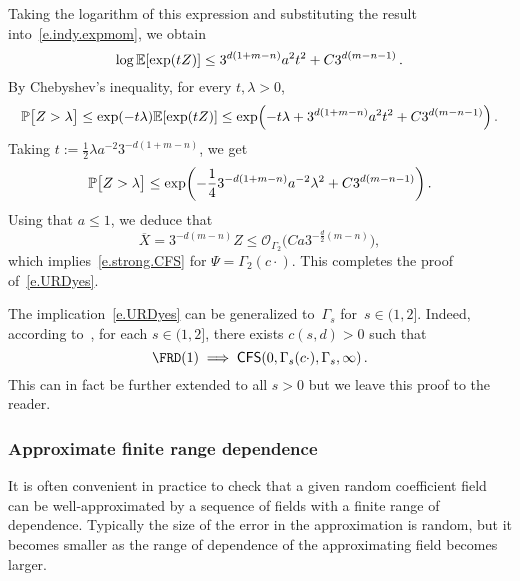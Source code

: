 \documentclass[11pt]{article} %
\numberwithin{equation}{section}
\theoremstyle{definition}
\let\originalleft\left
\let\originalright\right
\renewcommand{\left}{\mathopen{}\mathclose\bgroup\originalleft}
\renewcommand{\right}{\aftergroup\egroup\originalright}
\renewcommand{\P}{\mathbb{P}}
\newcommand{\E}{\mathbb{E}}
\renewcommand{\O}{\mathcal{O}}
\newcommand{\CFS}{\mathsf{CFS}}
\begin{document}
Taking the logarithm of this expression and substituting the result into~\eqref{e.indy.expmom}, we obtain 
\begin{equation*}
\log \E \left[ \exp\left( tZ\right) \right]
\leq 
3^{d(1+m-n)} a^2 t^2 + C 3^{d(m-n-1)} 
\,.
\end{equation*}
By Chebyshev's inequality, for every $t,\lambda>0$, 
\begin{align*}
\P \bigl[ Z > \lambda \bigr]
\leq 
\exp\left( -t\lambda \right)
\E \left[  \exp \left( t Z \right) \right]
\leq 
\exp\left( -t\lambda + 3^{d(1+m-n)} a^2 t^2 + C3^{d(m-n-1)} \right)\,.
\end{align*}
Taking $t:= \frac12 \lambda a^{-2} 3^{-d(1+m-n)}$, we get
\begin{equation} 
\label{e.unitrange.result}
\P \bigl[ Z > \lambda \bigr]
\leq
\exp\left( -\frac14 3^{-d(1+m-n)} a^{-2} \lambda^2 + C3^{d(m-n-1)} \right)\,.
\end{equation}
Using that $a\leq 1$, we deduce that
\begin{equation*}
\overline{X} = 
3^{-d(m-n)} Z 
\leq 
\O_{\Gamma_2}\bigl(Ca 3^{-\frac d2(m-n)} \bigr),
\end{equation*}
which implies~\eqref{e.strong.CFS} for $\Psi = \Gamma_2(c\cdot)$. This completes the proof of~\eqref{e.URDyes}. 

\smallskip

The implication~\eqref{e.URDyes} can be generalized to~$\Gamma_s$ for~$s \in (1,2]$. Indeed, according to~\cite[Lemma A.9 \& A.12]{AKMBook}, for each $s\in (1,2]$, there exists $c(s,d)>0$ such that 
\begin{equation}
\label{e.URDyes.s}
\FRD(1) \implies \CFS(0,\Gamma_s(c\cdot),\Gamma_s,\infty) \,.
\end{equation}
This can in fact be further extended to all $s>0$ but we leave this proof to the reader. 

\subsubsection{Approximate finite range dependence}
\label{ss.AFRD}
It is often convenient in practice to check that a given random coefficient field can be well-approximated by a sequence of fields with a finite range of dependence. Typically the size of the error in the approximation is random, but it becomes smaller as the range of dependence of the approximating field becomes larger.  

\smallskip
\end{document}
